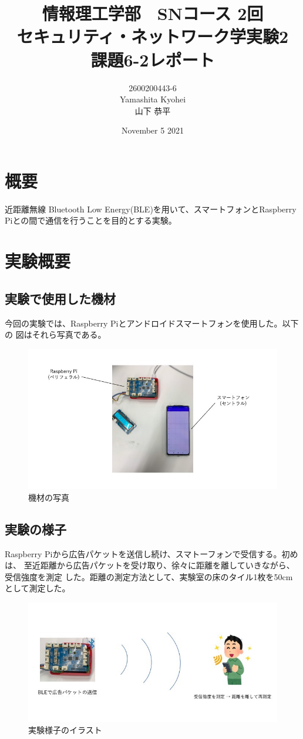 \documentclass[dvipdfmx,autodetect-engine,titlepage]{jsarticle}
\title{情報理工学部　SNコース 2回\\
セキュリティ・ネットワーク学実験2\\
課題6-2レポート}
\author{2600200443-6\\Yamashita Kyohei\\山下 恭平}
\date{November 5 2021}
\begin{document}
\maketitle

\section{概要}
近距離無線 Bluetooth Low Energy(BLE)を用いて、スマートフォンとRaspberry
Piとの間で通信を行うことを目的とする実験。

\section{実験概要}

\subsection{実験で使用した機材}
今回の実験では、Raspberry Piとアンドロイドスマートフォンを使用した。以下の
図はそれら写真である。

\begin{figure}[h]
  \centering
  \includegraphics[scale=0.4]{pic1.JPG}
  \caption{機材の写真}
\end{figure}

\subsection{実験の様子}
Raspberry Piから広告パケットを送信し続け、スマトーフォンで受信する。初めは、
至近距離から広告パケットを受け取り、徐々に距離を離していきながら、受信強度を測定
した。距離の測定方法として、実験室の床のタイル1枚を50cmとして測定した。

\begin{figure}[h]
  \centering
  \includegraphics[scale=0.4]{pic2.jpg}
  \caption{実験様子のイラスト}
\end{figure}
\end{document}
